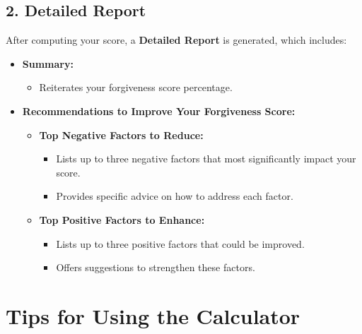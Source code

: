 \documentclass[11pt]{article}
\begin{document}
\subsection*{2. Detailed Report}

After computing your score, a \textbf{Detailed Report} is generated, which includes:

\begin{itemize}
    \item \textbf{Summary:}
    \begin{itemize}
        \item Reiterates your forgiveness score percentage.
    \end{itemize}
    \item \textbf{Recommendations to Improve Your Forgiveness Score:}
    \begin{itemize}
        \item \textbf{Top Negative Factors to Reduce:}
        \begin{itemize}
            \item Lists up to three negative factors that most significantly impact your score.
            \item Provides specific advice on how to address each factor.
        \end{itemize}
        \item \textbf{Top Positive Factors to Enhance:}
        \begin{itemize}
            \item Lists up to three positive factors that could be improved.
            \item Offers suggestions to strengthen these factors.
        \end{itemize}
    \end{itemize}
\end{itemize}

\section*{Tips for Using the Calculator}
\end{document}
